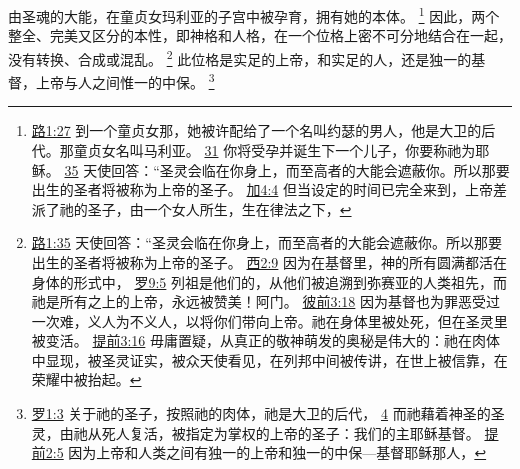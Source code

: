 \documentclass[12pt, a4paper, oneside]{ctexart}
\begin{document}
	由圣魂的大能，在童贞女玛利亚的子宫中被孕育，拥有她的本体。
	\footnote {
		\href{https://biblehub.com/luke/1-27.htm}{路1:27} 到一个童贞女那，她被许配给了一个名叫约瑟的男人，他是大卫的后代。那童贞女名叫马利亚。
		\href{https://biblehub.com/luke/1-31.htm}{31} 你将受孕并诞生下一个儿子，你要称祂为耶稣。
		\href{https://biblehub.com/luke/1-35.htm}{35} 天使回答：“圣灵会临在你身上，而至高者的大能会遮蔽你。所以那要出生的圣者将被称为上帝的圣子。
		\href{https://biblehub.com/galatians/4-4.htm}{加4:4} 但当设定的时间已完全来到，上帝差派了祂的圣子，由一个女人所生，生在律法之下，
	}
	因此，两个整全、完美又区分的本性，即神格和人格，在一个位格上密不可分地结合在一起，没有转换、合成或混乱。
	\footnote {
		\href{https://biblehub.com/luke/1-35.htm}{路1:35} 天使回答：“圣灵会临在你身上，而至高者的大能会遮蔽你。所以那要出生的圣者将被称为上帝的圣子。
		\href{https://biblehub.com/colossians/2-9.htm}{西2:9} 因为在基督里，神的所有圆满都活在身体的形式中，
		\href{https://biblehub.com/romans/9-5.htm}{罗9:5} 列祖是他们的，从他们被追溯到弥赛亚的人类祖先，而祂是所有之上的上帝，永远被赞美！阿门。
		\href{https://biblehub.com/1_peter/3-18.htm}{彼前3:18} 因为基督也为罪恶受过一次难，义人为不义人，以将你们带向上帝。祂在身体里被处死，但在圣灵里被变活。
		\href{https://biblehub.com/1_timothy/3-16.htm}{提前3:16} 毋庸置疑，从真正的敬神萌发的奥秘是伟大的：祂在肉体中显现，被圣灵证实，被众天使看见，在列邦中间被传讲，在世上被信靠，在荣耀中被抬起。
	}
	此位格是实足的上帝，和实足的人，还是独一的基督，上帝与人之间惟一的中保。
	\footnote {
		\href{https://biblehub.com/romans/1-3.htm}{罗1:3} 关于祂的圣子，按照祂的肉体，祂是大卫的后代，
		\href{https://biblehub.com/romans/1-4.htm}{4} 而祂藉着神圣的圣灵，由祂从死人复活，被指定为掌权的上帝的圣子：我们的主耶稣基督。
		\href{https://biblehub.com/1_timothy/2-5.htm}{提前2:5} 因为上帝和人类之间有独一的上帝和独一的中保---基督耶稣那人，
	}
\end{document}
